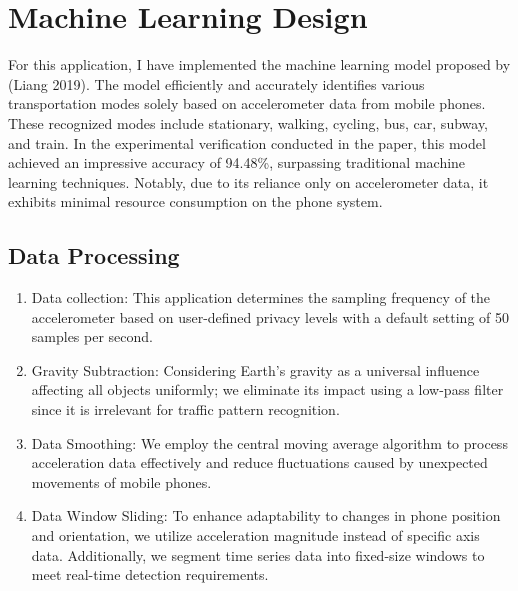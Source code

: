 \documentclass[12pt,two side]{report}
\begin{document}
\section{Machine Learning Design\cite{liang2019deep}}
For this application, I have implemented the machine learning model proposed by (Liang 2019). The model efficiently and accurately identifies various transportation modes solely based on accelerometer data from mobile phones. These recognized modes include stationary, walking, cycling, bus, car, subway, and train. In the experimental verification conducted in the paper, this model achieved an impressive accuracy of 94.48\%, surpassing traditional machine learning techniques. Notably, due to its reliance only on accelerometer data, it exhibits minimal resource consumption on the phone system.

\subsection{Data Processing}
\begin{enumerate}
    \item Data collection: This application determines the sampling frequency of the accelerometer based on user-defined privacy levels with a default setting of 50 samples per second.
    \item Gravity Subtraction: Considering Earth's gravity as a universal influence affecting all objects uniformly; we eliminate its impact using a low-pass filter since it is irrelevant for traffic pattern recognition.
    \item Data Smoothing: We employ the central moving average algorithm to process acceleration data effectively and reduce fluctuations caused by unexpected movements of mobile phones.
    \item Data Window Sliding: To enhance adaptability to changes in phone position and orientation, we utilize acceleration magnitude instead of specific axis data. Additionally, we segment time series data into fixed-size windows to meet real-time detection requirements.
\end{enumerate}
\end{document}
